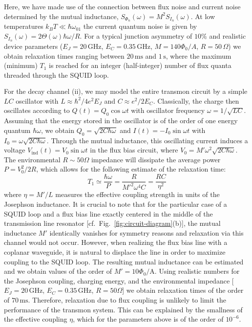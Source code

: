 \documentclass[twocolumn,amsmath,amssymb,floatfix,pra,showpacs,eqsecnum,footinbib,superscriptaddress]{revtex4}
\newcounter{fig}
\newcommand{\be}{\begin{equation}}
\newcommand{\ee}{\end{equation}}
\begin{document}
Here, we have made use of the connection between flux noise and current noise determined by the mutual inductance, $S_{\Phi_n}(\omega)={M^2}S_{I_n}(\omega)$. At low temperatures $k_BT \ll \hbar\omega_{01}$ the current quantum noise is given by $S_{I_n}(\omega)=2\Theta(\omega)\hbar\omega/R$. For a typical junction asymmetry of $10\%$ and realistic device parameters ($E_J=20\,\text{GHz}$, $E_C=0.35\,\text{GHz}$, $M=140\Phi_0/A$, $R=50\,\Omega$) we obtain relaxation times ranging between $20\,\text{ms}$ and $1\,\text{s}$, where the maximum (minimum) $T_1$ is reached for an integer (half-integer) number of flux quanta threaded through the SQUID loop.

For the decay channel (ii), we may model the entire transmon circuit by a simple $LC$ oscillator with $L\approx \hbar^2/4e^2E_J$ and $C\approx e^2/2E_C$. Classically, the charge then oscillates according to $Q(t)=Q_0 \cos \omega t$ with oscillator frequency $\omega=1/\sqrt{LC}$. Assuming that the energy stored in the oscillator is of the order of one energy quantum $\hbar\omega$, we obtain $Q_0=\sqrt{2C\hbar\omega}$ and $I(t)=-I_0\sin \omega t$ with $I_0=\omega\sqrt{2C\hbar\omega}$. Through the mutual inductance, this oscillating current induces a voltage $V_\text{ind}(t) = V_0 \sin \omega t$ in the flux bias circuit, where $V_0=M'\omega^2 \sqrt{2C\hbar\omega}$. The environmental $R\sim50\Omega$ impedance will dissipate the average power $P=V_0^2/2R$, which allows for the following estimate of the relaxation time:
\be
T_1\simeq \frac{\hbar\omega}{P} = \frac{R}{{M'}^2\omega^4C}=\frac{RC}{\eta^2}
\ee
where $\eta=M'/L$ measures the effective coupling strength in units of the Josephson inductance. It is crucial to note that for the particular case of a SQUID loop and a flux bias line exactly centered in the middle of the transmission line resonator [cf.\ Fig.\ \ref{fig:circuit-diagram}(b)], the mutual inductance $M'$ identically vanishes for symmetry reasons and relaxation via this channel would not occur. However, when realizing the flux bias line with a coplanar waveguide, it is natural to displace the line in order to maximize coupling to the SQUID loop. The resulting mutual inductance can be estimated and we obtain values of the order of $M'=10\Phi_0/\text{A}$. Using realistic numbers for the Josephson coupling, charging energy, and the environmental impedance [$E_J=20\,\text{GHz}$, $E_C=0.35\,\text{GHz}$, $R=50\Omega$] we obtain relaxation times of the order of $70\,\text{ms}$. Therefore, relaxation due to flux coupling is unlikely to limit the performance of the transmon system. This can be explained by the smallness of the effective coupling $\eta$, which for the parameters above is of the order of $10^{-6}$.
\end{document}
